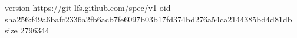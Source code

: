 version https://git-lfs.github.com/spec/v1
oid sha256:f49a6bafc2336a2fb6acb7fe6097b03b17fd374bd276a54ca2144385bd4d81db
size 2796344
